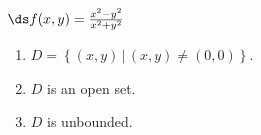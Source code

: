 {$\ds f(x,y) = \frac{x^2-y^2}{x^2+y^2}$}
{\begin{enumerate}
\item $D = \left\{(x,y)\, |\, (x,y)\neq (0,0) \right\}$.
\item $D$ is an open set.
\item	$D$ is unbounded.
\end{enumerate}
}